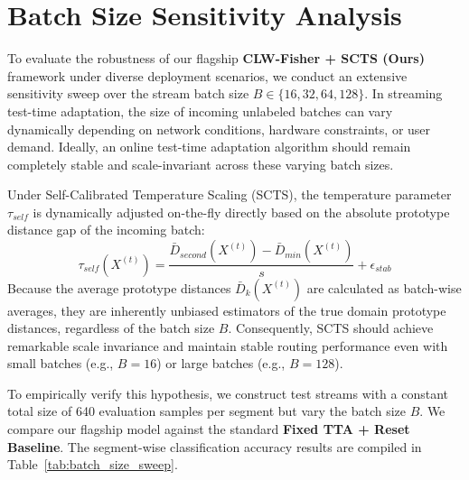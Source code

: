 \documentclass{article}
\theoremstyle{plain}
\theoremstyle{definition}
\theoremstyle{remark}
\begin{document}



\clearpage
\appendix
\onecolumn
\section{Batch Size Sensitivity Analysis}
\label{sec:appendix_batch_size}

To evaluate the robustness of our flagship \textbf{CLW-Fisher + SCTS (Ours)} framework under diverse deployment scenarios, we conduct an extensive sensitivity sweep over the stream batch size $B \in \{16, 32, 64, 128\}$. In streaming test-time adaptation, the size of incoming unlabeled batches can vary dynamically depending on network conditions, hardware constraints, or user demand. Ideally, an online test-time adaptation algorithm should remain completely stable and scale-invariant across these varying batch sizes.

Under Self-Calibrated Temperature Scaling (SCTS), the temperature parameter $\tau_{self}$ is dynamically adjusted on-the-fly directly based on the absolute prototype distance gap of the incoming batch:
\begin{equation}
  \tau_{self}(X^{(t)}) = \frac{\bar{D}_{second}(X^{(t)}) - \bar{D}_{min}(X^{(t)})}{s} + \epsilon_{stab}
\end{equation}
Because the average prototype distances $\bar{D}_k(X^{(t)})$ are calculated as batch-wise averages, they are inherently unbiased estimators of the true domain prototype distances, regardless of the batch size $B$. Consequently, SCTS should achieve remarkable scale invariance and maintain stable routing performance even with small batches (e.g., $B=16$) or large batches (e.g., $B=128$).

To empirically verify this hypothesis, we construct test streams with a constant total size of 640 evaluation samples per segment but vary the batch size $B$. We compare our flagship model against the standard \textbf{Fixed TTA + Reset Baseline}. The segment-wise classification accuracy results are compiled in Table~\ref{tab:batch_size_sweep}.
\end{document}
